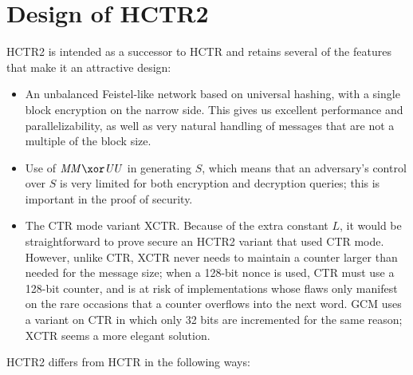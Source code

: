 \documentclass[hctr2.tex]{subfiles}
\begin{document}
\section{Design of HCTR2}\label{design}
HCTR2 is intended as a successor to HCTR and retains several of the
features that make it an attractive design:
\begin{itemize}
    \item An unbalanced Feistel-like network based on universal
    hashing, with a single block encryption on the narrow side.
    This gives us excellent performance and parallelizability,
    as well as very natural handling of messages that are not
    a multiple of the block size. 
    \item Use of \(\MM \xor \UU\) in generating \(S\), which means
    that an adversary's control over \(S\) is very limited for both
    encryption and decryption queries; this is important in the
    proof of security.
    \item The CTR mode variant XCTR.
    Because of the extra constant \(L\), it would be straightforward
    to prove secure an HCTR2 variant that used CTR mode.
    However, unlike CTR, XCTR
    never needs to maintain a counter larger
    than needed for the message size;
    when a 128-bit nonce is used, CTR 
    must use a 128-bit counter, and is
    at risk of implementations
    whose flaws only manifest on the
    rare occasions that a counter overflows
    into the next word.
    GCM\cite{gcm} uses a variant on CTR
    in which only 32 bits are incremented
    for the same reason;
    XCTR seems a more elegant solution.
\end{itemize}

HCTR2 differs from HCTR in the following ways:
\end{document}

